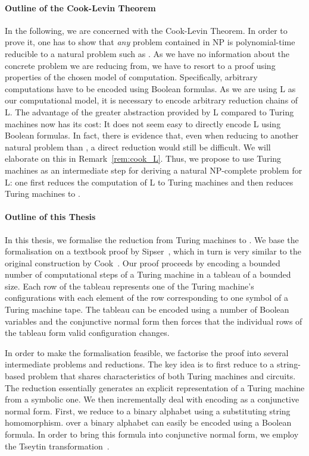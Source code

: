 \paragraph{Outline of the Cook-Levin Theorem}
In the following, we are concerned with the Cook-Levin Theorem.
In order to prove it, one has to show that \emph{any} problem contained in NP is polynomial-time reducible to a natural problem such as \SAT{}. 
As we have no information about the concrete problem we are reducing from, we have to resort to a proof using properties of the chosen model of computation. 
Specifically, arbitrary computations have to be encoded using Boolean formulas.
As we are using L as our computational model, it is necessary to encode arbitrary reduction chains of L. The advantage of the greater abstraction provided by L compared to Turing machines now has its cost: It does not seem easy to directly encode L using Boolean formulas. In fact, there is evidence that, even when reducing to another natural problem than \SAT{}, a direct reduction would still be difficult. We will elaborate on this in Remark~\ref{rem:cook_L}.
Thus, we propose to use Turing machines as an intermediate step for deriving a natural NP-complete problem for L: one first reduces the computation of L to Turing machines and then reduces Turing machines to \SAT{}. 

\paragraph{Outline of this Thesis}
In this thesis, we formalise the reduction from Turing machines to \SAT{}. We base the formalisation on a textbook proof by Sipser~\cite{Sipser:TheoryofComputation}, which in turn is very similar to the original construction by Cook~\cite{cook_theorem}. Our proof proceeds by encoding a bounded number of computational steps of a Turing machine in a tableau of a bounded size. 
Each row of the tableau represents one of the Turing machine's configurations with each element of the row corresponding to one symbol of a Turing machine tape. The tableau can be encoded using a number of Boolean variables and the conjunctive normal form then forces that the individual rows of the tableau form valid configuration changes.

In order to make the formalisation feasible, we factorise the proof into several intermediate problems and reductions. The key idea is to first reduce to a string-based problem \PR{} that shares characteristics of both Turing machines and circuits. 
The reduction essentially generates an explicit representation of a Turing machine from a symbolic one.
We then incrementally deal with encoding \PR{} as a conjunctive normal form. First, we reduce to a binary alphabet using a substituting string homomorphism. 
\PR{} over a binary alphabet can easily be encoded using a Boolean formula. In order to bring this formula into conjunctive normal form, we employ the Tseytin transformation~\cite{Tseitin1983}.

